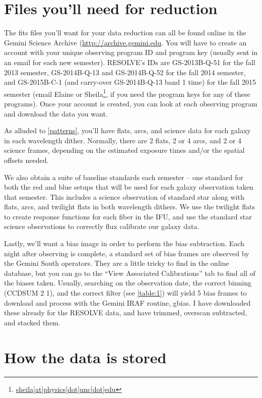 \documentclass[12pt]{report}
\begin{document}
\section{Files you'll need for reduction}
\label{files}

The fits files you'll want for your data reduction can all be found online in the Gemini Science Archive (\url{http://archive.gemini.edu}. You will have to create an account with your unique observing program ID and program key (usually sent in an email for each new semester). RESOLVE's IDs are GS-2013B-Q-51 for the fall 2013 semester, GS-2014B-Q-13 and GS-2014B-Q-52 for the fall 2014 semester, and GS-2015B-C-1 (and carry-over GS-2014B-Q-13 band 1 time) for the fall 2015 semester (email Elaine or Sheila\footnote{\url{sheila[at]physics[dot]unc[dot]edu}}, if you need the program keys for any of these programs). Once your account is created, you can look at each observing program and download the data you want.

As alluded to \autoref{patterns}, you'll have flats, arcs, and science data for each galaxy in each wavelength dither. Normally, there are 2 flats, 2 or 4 arcs, and 2 or 4 science frames, depending on the estimated exposure times and/or the spatial offsets needed.

We also obtain a suite of baseline standards each semester -- one standard for both the red and blue setups that will be used for each galaxy observation taken that semester. This includes a science observation of standard star along with flats, arcs, and twilight flats in both wavelength dithers. We use the twilight flats to create response functions for each fiber in the IFU, and use the standard star science observations to correctly flux calibrate our galaxy data.

Lastly, we'll want a bias image in order to perform the bias subtraction. Each night after observing is complete, a standard set of bias frames are observed by the Gemini South operators. They are a little tricky to find in the online database, but you can go to the ``View Associated Calibrations'' tab to find all of the biases taken. Usually, searching on the observation date, the correct binning (CCDSUM 2 1), and the correct filter (see \autoref{table:1}) will yield 5 bias frames to download and process with the Gemini IRAF routine, gbias. I have downloaded these already for the RESOLVE data, and have trimmed, overscan subtracted, and stacked them.

\section{How the data is stored}
\end{document}
